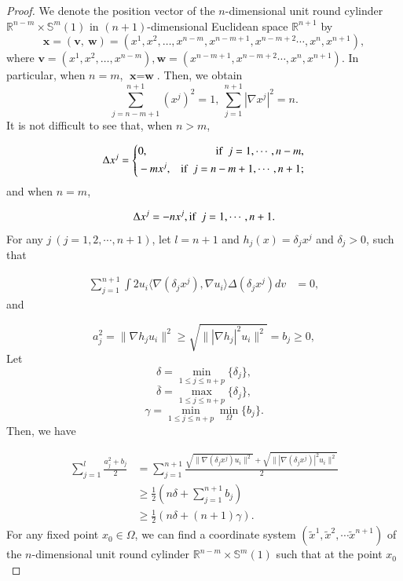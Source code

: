 \documentclass[12pt]{article}
\numberwithin{equation}{section}
\begin{document}
\begin{proof}  We denote the position vector of the $n$-dimensional unit round
cylinder $\mathbb{R}^{n-m}\times\mathbb{S}^{m}(1)$ in
$(n+1)$-dimensional Euclidean space $\mathbb{R}^{n+1}$ by $$\textbf{x}
=(\textbf{v},~\textbf{w})= (x^{1},
x^{2},\ldots,x^{n-m},x^{n-m+1},x^{n-m+2} \cdots,x^{n}, x^{n+1}),$$
where $\textbf{v}=(x^{1},
x^{2},\ldots,x^{n-m}),\textbf{w}=(x^{n-m+1},x^{n-m+2} \cdots,x^{n},
x^{n+1})$. In particular, when $n=m$, $\textbf{x}=\textbf{w}$. Then, we obtain
\begin{equation}\label{4.3.54}\sum^{n+1}_{j=n-m+1}(x^{j})^{2}=1,~ \sum^{n+1}_{j=1}|\nabla x^{j}|^{2}=n.\end{equation} It is not difficult to see that, when $n>m$,


\begin{equation}\label{4.3.55}\Delta x^{j}=
\left\{ \begin{aligned}
     &0, &\textnormal{if}\ \ j=1,\cdots,n-m,   \\
                  &-mx^{j},  &\textnormal{if}\ \ j=n-m+1,\cdots,n+1;
                          \end{aligned} \right.
                          \end{equation}and when $n=m$,

\begin{equation}\label{4.3}\Delta x^{j}=-nx^{j}, \textnormal{if}\ \ j=1,\cdots,n+1.\end{equation}
For any $j~(j=1,2,\cdots,n+1)$,   let $l=n+1$ and
$h_{j}(x)=\delta_{j}x^{j}$ and $\delta_{j}>0$, such that

\begin{equation}\begin{aligned}\label{sum-0} \sum_{j=1}^{n+1}\int2 u_{i}\langle\nabla (\delta_{j}x^{j}),\nabla u_{i}\rangle\Delta  (\delta_{j}x^{j})dv&=0,\end{aligned}\end{equation} and


\begin{equation*}a_{j}^{2}=\|\nabla h_{j}u_{i}\|^{2}\geq\sqrt{\||\nabla h_{j}|^{2}u_{i}\|^{2}}=b_{j}\geq0,\end{equation*}
Let $$\delta=\min_{1\leq j\leq n+p}\{\delta_{j}\},$$$$\overline{\delta}=\max_{1\leq j\leq n+p}\{\delta_{j}\},$$
$$\gamma=\min_{1\leq j\leq n+p}\min_{\Omega}\{b_{j}\}.$$
Then, we have

\begin{equation}\begin{aligned}\label{eq-a-b}\sum_{j=1}^{l}\frac{a_{j}^{2}+b_{j}}{2}&=\sum_{j=1}^{n+1}
\frac{\sqrt{\|\nabla (\delta_{j}x^{j})u_{i}\|^{2}}+\sqrt{\||\nabla (\delta_{j}x^{j})|^{2}u_{i}\|^{2}}}{2}\\&\geq\frac{1}{2}\left(n\delta+\sum^{n+1}_{j=1}b_{j}\right)
\\&\geq\frac{1}{2}\left(n\delta+(n+1)\gamma\right).
\end{aligned}\end{equation}
For any fixed point $x_{0}\in\Omega$, we can find a coordinate
system $(\widetilde{x}^{1},\widetilde{x}^{2},\cdots
\widetilde{x}^{n+1})$ of the $n$-dimensional unit round cylinder
$\mathbb{R}^{n-m}\times\mathbb{S}^{m}(1)$ such that at the point
$x_{0}$


\end{proof}
\end{document}
